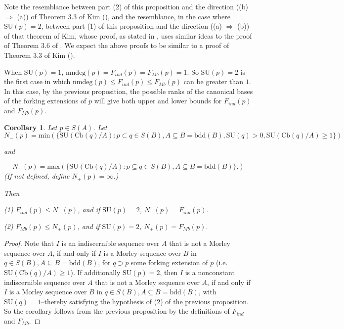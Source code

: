 \documentclass[11pt]{amsart}
\newtheorem{cor}[theorem]{Corollary}
\theoremstyle{definition}
\theoremstyle{remark}
\numberwithin{equation}{section}
\begin{document}
Note the resemblance between part (2) of this proposition and the direction ((b) $\Rightarrow$ (a)) of Theorem 3.3 of Kim (\cite{Kim10}), and the resemblance, in the case where $\mathrm{SU}(p)=2$, between part (1) of this proposition and the direction ((a) $\Rightarrow$ (b)) of that theorem of Kim, whose proof, as stated in \cite{Kim10}, uses similar ideas to the proof of Theorem 3.6 of \cite{DPK03}. We expect the above proofs to be similar to a proof of Theorem 3.3 of Kim (\cite{Kim10}).


When $\mathrm{SU}(p) = 1$, $\mathrm{nmdeg}(p)=F_{ind}(p)=F_{Mb}(p)=1$. So $\mathrm{SU}(p) = 2$ is the first case in which $\mathrm{nmdeg}(p)\leq F_{ind}(p) \leq F_{Mb}(p)$ can be greater than $1$. In this case, by the previous proposition, the possible ranks of the canonical bases of the forking extensions of $p$ will give both upper and lower bounds for $F_{ind}(p)$ and $F_{Mb}(p)$.

\begin{cor}\label{rank2}
    Let $p \in S(A)$. Let 
    $$N_{-}(p) = \mathrm{min}(\{\mathrm{SU}(\mathrm{Cb}(q)/A): p \subset q \in S(B), A \subseteq B = \mathrm{bdd}(B), \mathrm{SU}(q) > 0, \mathrm{SU}(\mathrm{Cb}(q)/A) \geq 1 \})$$

    and

    $$N_{+}(p) = \mathrm{max}(\{\mathrm{SU}(\mathrm{Cb}(q)/A): p \subseteq q \in S(B), A \subseteq B = \mathrm{bdd}(B) \}.)$$ (If not defined, define $N_{+}(p)= \infty$.)

    Then 

    (1) $F_{ind}(p) \leq N_{-}(p)  $, and if $\mathrm{SU}(p) = 2$, $N_{-}(p) = F_{ind}(p)$.

    (2) $F_{Mb}(p) \leq N_{+}(p)  $, and if $\mathrm{SU}(p) = 2$, $N_{+}(p) = F_{Mb}(p)$.
\end{cor}

\begin{proof}
    Note that $I$ is an indiscernible sequence over $A$ that is not a Morley sequence over $A$, if and only if $I$ is a Morley sequence over $B$ in $q \in S(B), A \subseteq B = \mathrm{bdd}(B)$, for $q \supset p$ some forking extension of $p$ (i.e. $\mathrm{SU}(\mathrm{Cb}(q)/A) \geq 1$). If additionally $\mathrm{SU}(p) = 2$, then $I$ is a nonconstant indiscernible sequence over $A$ that is not a Morley sequence over $A$, if and only if $I$ is a Morley sequence over $B$ in $q \in S(B), A \subseteq B = \mathrm{bdd}(B)$, with $\mathrm{SU}(q)=1$--thereby satisfying the hypothesis of (2) of the previous proposition. So the corollary follows from the previous proposition by the definitions of $F_{ind}$ and $F_{Mb}$.

    
\end{proof}
\end{document}
